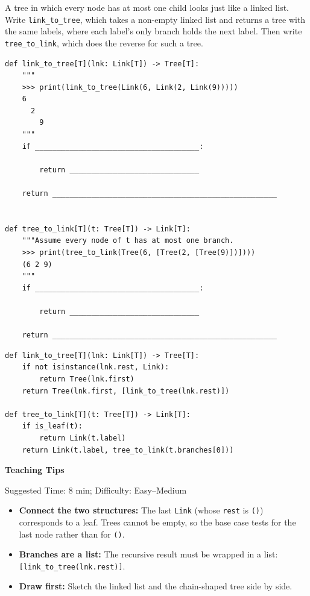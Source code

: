 \begin{blocksection}
\question A tree in which every node has at most one child looks just like a linked list. Write \lstinline{link_to_tree}, which takes a non-empty linked list and returns a tree with the same labels, where each label's only branch holds the next label. Then write \lstinline{tree_to_link}, which does the reverse for such a tree.

\begin{lstlisting}
def link_to_tree[T](lnk: Link[T]) -> Tree[T]:
    """
    >>> print(link_to_tree(Link(6, Link(2, Link(9)))))
    6
      2
        9
    """
    if ______________________________________:

        return ______________________________

    return ____________________________________________________


def tree_to_link[T](t: Tree[T]) -> Link[T]:
    """Assume every node of t has at most one branch.
    >>> print(tree_to_link(Tree(6, [Tree(2, [Tree(9)])])))
    (6 2 9)
    """
    if ______________________________________:

        return ______________________________

    return ____________________________________________________
\end{lstlisting}
\begin{solution}[1in]
\begin{lstlisting}
def link_to_tree[T](lnk: Link[T]) -> Tree[T]:
    if not isinstance(lnk.rest, Link):
        return Tree(lnk.first)
    return Tree(lnk.first, [link_to_tree(lnk.rest)])

def tree_to_link[T](t: Tree[T]) -> Link[T]:
    if is_leaf(t):
        return Link(t.label)
    return Link(t.label, tree_to_link(t.branches[0]))
\end{lstlisting}
\end{solution}
\end{blocksection}

\begin{questionmeta}
\textbf{Teaching Tips}\par\nopagebreak[4]
Suggested Time: 8 min; Difficulty: Easy--Medium
\nopagebreak[4]
\begin{itemize}
    \item \textbf{Connect the two structures:} The last \lstinline{Link} (whose \lstinline{rest} is \lstinline{()}) corresponds to a leaf. Trees cannot be empty, so the base case tests for the last node rather than for \lstinline{()}.
    \item \textbf{Branches are a list:} The recursive result must be wrapped in a list: \lstinline{[link_to_tree(lnk.rest)]}.
    \item \textbf{Draw first:} Sketch the linked list and the chain-shaped tree side by side.
\end{itemize}
\end{questionmeta}
